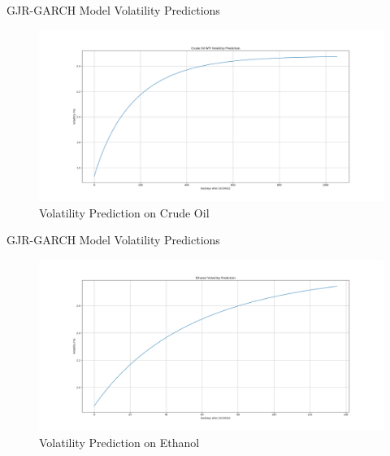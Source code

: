 \documentclass[8pt]{beamer}
\numberwithin{equation}{section}
\begin{document}
\begin{frame}{GJR-GARCH Model Volatility Predictions}

\begin{figure}[!ht]
	\includegraphics[width=\linewidth]{CrudeOilvol.png} %
	\caption{Volatility Prediction on Crude Oil} %
	\label{oil pred} %
\end{figure}

\end{frame}

\begin{frame}{GJR-GARCH Model Volatility Predictions}

\begin{figure}[!ht]
	\includegraphics[width=\linewidth]{Ethanolvol.png} %
	\caption{Volatility Prediction on Ethanol} %
	\label{eth pred} %
\end{figure}

\end{frame}
\end{document}
